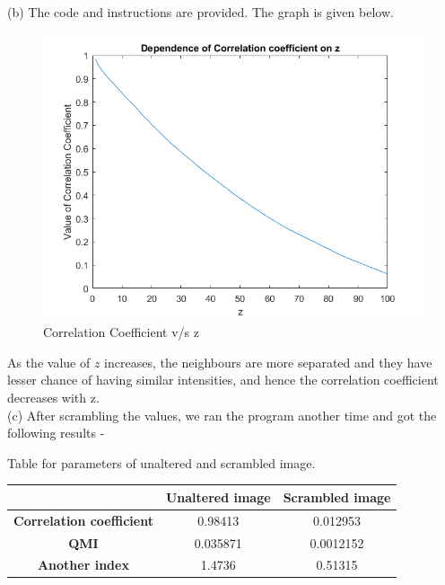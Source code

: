 \documentclass[11pt]{article}
\begin{document}
\begin{enumerate}
{		(b) The code and instructions are provided. The graph is given below.
		\begin{figure}[H]
		\caption{Correlation Coefficient v/s z}
		\centering
		\includegraphics[width=\textwidth]{partB}
		\end{figure}
		As the value of $z$ increases, the neighbours are more separated and they have lesser chance of having similar intensities, and hence the correlation coefficient decreases with z. \\
		
		(c) After scrambling the values, we ran the program another time and got the following results - \\
		\begin{center}
		Table for parameters of unaltered and scrambled image. \\
		\begin{tabular}{ | c | c | c | } 
		 \hline
		  & \textbf{Unaltered image} & \textbf{Scrambled image} \\ 
		 \hline
		 \textbf{Correlation coefficient} & 0.98413 & 0.012953\\ 
		 \hline
		 \textbf{QMI} & 0.035871 & 0.0012152\\ 
		 \hline
		 \textbf{Another index} & 1.4736 & 0.51315\\ 
		 \hline
		\end{tabular}
		\end{center}

}
\end{enumerate}
\end{document}
